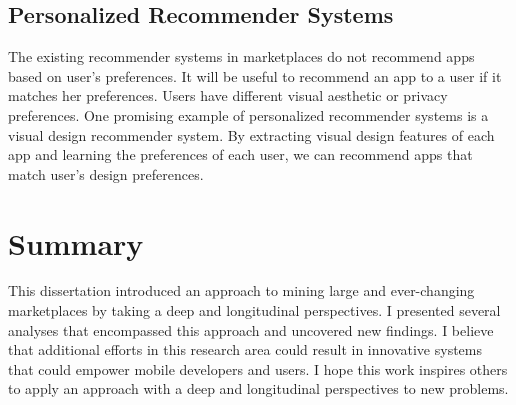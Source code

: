 \subsection*{Personalized Recommender Systems}
The existing recommender systems in marketplaces do not recommend apps based on user's preferences.
It will be useful to recommend an app to a user if it matches her preferences.
Users have different visual aesthetic or privacy preferences.
One promising example of personalized recommender systems is a visual design recommender system.
By extracting visual design features of each app and learning the preferences of each user, we can recommend apps that match user's design preferences.

\section{Summary}
This dissertation introduced an approach to mining large and ever-changing marketplaces by taking a deep and longitudinal perspectives.
I presented several analyses that encompassed this approach and uncovered new findings.
I believe that additional efforts in this research area could result in innovative systems that could empower mobile developers and users.
I hope this work inspires others to apply an approach with a deep and longitudinal perspectives to new problems.